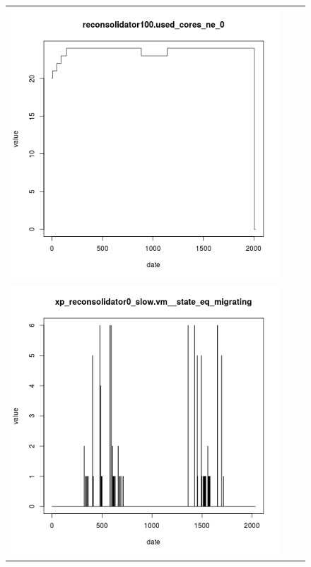 \documentclass[parallelisme]{compas2017}
\begin{document}
\begin{figure}[]
\begin{tabular}{ccc}
\includegraphics[scale=0.30]{reconsolidator100_used_cores_ne_0}\\
\includegraphics[scale=0.30]{xp_reconsolidator0_slow_vm__state_eq_migrating}&

\end{tabular}
\end{figure}
\end{document}
